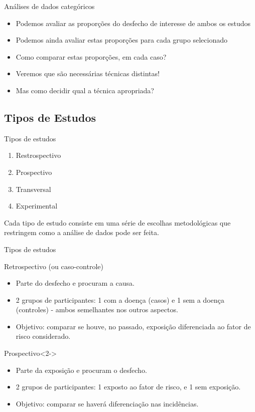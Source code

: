 \documentclass{beamer}
\begin{document}
\begin{frame}{Análises de dados categóricos}
  \begin{itemize}
  \item Podemos avaliar as proporções do desfecho de interesse de ambos os estudos
  \item Podemos ainda avaliar estas proporções para cada grupo selecionado
  \item Como comparar estas proporções, em cada caso?
  \item Veremos que são necessárias técnicas distintas!
  \item Mas como decidir qual a técnica apropriada?
  \end{itemize}
\end{frame}

\subsection{Tipos de Estudos}

\begin{frame}{Tipos de estudos}
  \begin{enumerate}
  \item Restrospectivo
  \item Prospectivo
  \item Transversal
  \item Experimental
  \end{enumerate}
  \begin{block}{}
    Cada tipo de estudo consiste em uma série de escolhas metodológicas que restringem como a análise de dados pode ser feita.
  \end{block}
\end{frame}

\begin{frame}{Tipos de estudos}
  \begin{block}{Retrospectivo (ou caso-controle)}
    \begin{itemize}
    \item Parte do desfecho e procuram a causa.
    \item 2 grupos de participantes: 1 com a doença (casos) e 1 sem a doença (controles) - ambos semelhantes nos outros aspectos.
    \item Objetivo: comparar se houve, no passado, exposição diferenciada ao fator de risco considerado.
    \end{itemize}
  \end{block}
  \begin{block}{Prospectivo}<2->
    \begin{itemize}
    \item Parte da exposição e procuram o desfecho.
    \item 2 grupos de participantes: 1 exposto ao fator de risco, e 1 sem exposição.
    \item Objetivo: comparar se haverá diferenciação nas incidências.
    \end{itemize}
  \end{block}
\end{frame}
\end{document}
